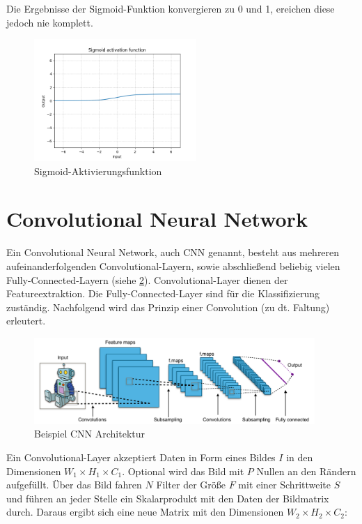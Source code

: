 Die Ergebnisse der Sigmoid-Funktion konvergieren zu 0 und 1, ereichen diese jedoch nie komplett.

\begin{figure}[H]
	\centering
	\includegraphics[width=0.55\textwidth]{resources/content/Sigmoid.png}
	\caption{Sigmoid-Aktivierungsfunktion \cite{sigmoid_activation_function_img}}
	\label{img:sigmoid_activation_function}
\end{figure}

\section{Convolutional Neural Network}
\label{sec:conv_networks}

Ein Convolutional Neural Network, auch CNN genannt, besteht aus mehreren aufeinanderfolgenden Convolutional-Layern, sowie
abschließend beliebig vielen Fully-Connected-Layern (siehe \ref{img:cnn_example_network}). Convolutional-Layer dienen der Featureextraktion. Die Fully-Connected-Layer sind für die Klassifizierung zuständig. Nachfolgend wird das Prinzip einer Convolution (zu dt. Faltung) erleutert.

\begin{figure}[H]
	\centering
	\includegraphics[width=0.95\textwidth]{resources/content/cnn/typical_cnn.png}
	\caption{Beispiel CNN Architektur \cite{typical_cnn_img}}
	\label{img:cnn_example_network}
\end{figure}

Ein Convolutional-Layer akzeptiert Daten in Form eines Bildes $ I $ in den Dimensionen $ W_1 \times H_1 \times C_1 $. Optional wird das Bild mit $ P $ Nullen an den Rändern aufgefüllt. Über das Bild fahren $ N $ Filter der Größe $ F $ mit einer Schrittweite $ S $ und führen an jeder Stelle ein Skalarprodukt mit den Daten der Bildmatrix durch. Daraus ergibt sich eine neue Matrix mit den Dimensionen $ W_2 \times H_2 \times C_2 $:


